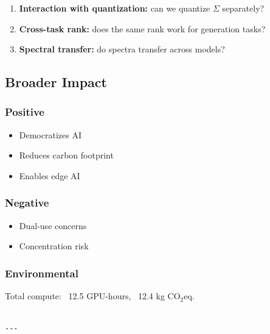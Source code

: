\begin{enumerate}
\item \textbf{Interaction with quantization:} can we quantize $\Sigma$ separately?
\item \textbf{Cross-task rank:} does the same rank work for generation tasks?
\item \textbf{Spectral transfer:} do spectra transfer across models?

\end{enumerate}
\subsection{Broader Impact}

\subsubsection{Positive}
\begin{itemize}
\item Democratizes AI
\item Reduces carbon footprint
\item Enables edge AI

\end{itemize}
\subsubsection{Negative}
\begin{itemize}
\item Dual-use concerns
\item Concentration risk

\end{itemize}
\subsubsection{Environmental}
Total compute: ~12.5 GPU-hours, ~12.4 kg CO$_2$eq.
\begin{lstlisting}

---
\end{lstlisting}